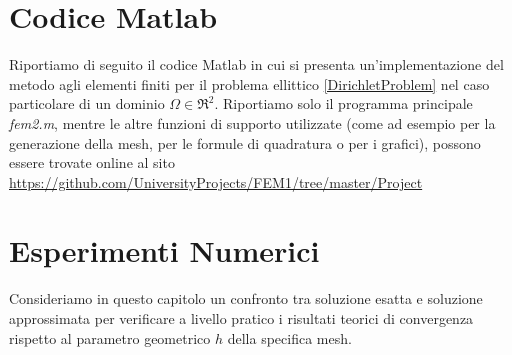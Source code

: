 \documentclass[12pt,a4paper]{report}
\theoremstyle{theorem}
\theoremstyle{definition}
\begin{document}
\chapter{Codice Matlab}

Riportiamo di seguito il codice Matlab in cui si presenta un'implementazione del metodo agli elementi finiti per il problema ellittico \ref{DirichletProblem} nel caso particolare di un dominio $\Omega \in \Re^{2}$. Riportiamo solo il programma principale \emph{fem2.m}, mentre le altre funzioni di supporto utilizzate (come ad esempio per la generazione della mesh, per le formule di quadratura o per i grafici), possono essere trovate online al sito \url{https://github.com/UniversityProjects/FEM1/tree/master/Project}
%



\chapter{Esperimenti Numerici}
Consideriamo in questo capitolo un confronto tra soluzione esatta e soluzione approssimata per verificare a livello pratico i risultati teorici di convergenza rispetto al parametro geometrico $h$ della specifica mesh.


\printindex

% 

%

\end{document}
